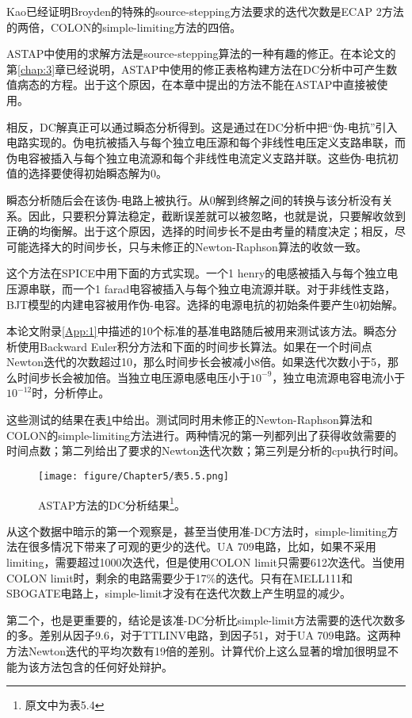 Kao\cite{ref-58}已经证明Broyden\cite{ref-61}的特殊的source-stepping方法要求的迭代次数是ECAP 2方法\cite{ref-32}的两倍，COLON的simple-limiting方法的四倍。

ASTAP\cite{ref-29}中使用的求解方法是source-stepping算法的一种有趣的修正。在本论文的第\ref{chap:3}章已经说明，ASTAP中使用的修正表格构建方法在DC分析中可产生数值病态的方程。出于这个原因，在本章中提出的方法不能在ASTAP中直接被使用。

相反，DC解真正可以通过瞬态分析得到。这是通过在DC分析中把“伪-电抗”引入电路实现的。伪电抗被插入与每个独立电压源和每个非线性电压定义支路串联，而伪电容被插入与每个独立电流源和每个非线性电流定义支路并联。这些伪-电抗初值的选择要使得初始瞬态解为0。

瞬态分析随后会在该伪-电路上被执行。从0解到终解之间的转换与该分析没有关系。因此，只要积分算法稳定，截断误差就可以被忽略，也就是说，只要解收敛到正确的均衡解。出于这个原因，选择的时间步长不是由考量的精度决定；相反，尽可能选择大的时间步长，只与未修正的Newton-Raphson算法的收敛一致。

这个方法在SPICE中用下面的方式实现。一个1 henry的电感被插入与每个独立电压源串联，而一个1 farad电容被插入与每个独立电流源并联。对于非线性支路，BJT模型的内建电容被用作伪-电容。选择的电源电抗的初始条件要产生0初始解。

本论文附录\ref{App:1}中描述的10个标准的基准电路随后被用来测试该方法。瞬态分析使用Backward Euler积分方法和下面的时间步长算法。如果在一个时间点Newton迭代的次数超过10，那么时间步长会被减小8倍。如果迭代次数小于5，那么时间步长会被加倍。当独立电压源电感电压小于$10^{-9}$，独立电流源电容电流小于$10^{-12}$时，分析停止。

这些测试的结果在表\ref{表5.5}中给出。测试同时用未修正的Newton-Raphson算法和COLON的simple-limiting方法进行。两种情况的第一列都列出了获得收敛需要的时间点数；第二列给出了要求的Newton迭代次数；第三列是分析的cpu执行时间。
\begin{figure}[htbp]
\small
    \centering
    \texttt{[image: figure/Chapter5/表5.5.png]}
    \caption{ASTAP方法的DC分析结果\footnote{原文中为表5.4}。}
    \label{表5.5}
\end{figure}

从这个数据中暗示的第一个观察是，甚至当使用准-DC方法时，simple-limiting方法在很多情况下带来了可观的更少的迭代。UA 709电路，比如，如果不采用limiting，需要超过1000次迭代，但是使用COLON limit只需要612次迭代。当使用COLON limit时，剩余的电路需要少于17\%的迭代。只有在MELL111和SBOGATE电路上，simple-limit才没有在迭代次数上产生明显的减少。

第二个，也是更重要的，结论是该准-DC分析比simple-limit方法需要的迭代次数多的多。差别从因子9.6，对于TTLINV电路，到因子51，对于UA 709电路。这两种方法Newton迭代的平均次数有19倍的差别。计算代价上这么显著的增加很明显不能为该方法包含的任何好处辩护。

